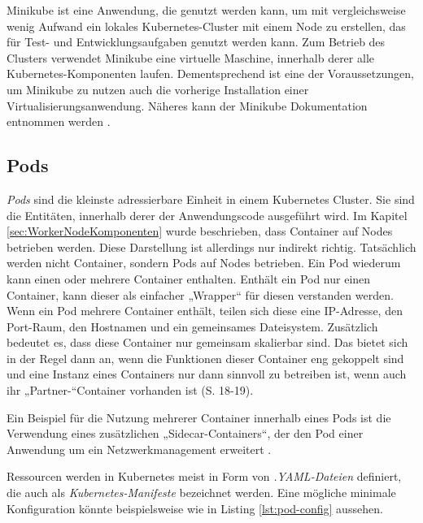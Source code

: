 \documentclass[11pt,a4paper]{article}
\begin{document}
Minikube ist eine Anwendung, die genutzt werden kann, um mit vergleichsweise wenig Aufwand ein lokales
Kubernetes-Cluster mit einem Node zu erstellen, das für Test- und Entwicklungsaufgaben genutzt werden kann.
Zum Betrieb des Clusters verwendet Minikube eine virtuelle Maschine, innerhalb derer
alle Kubernetes-Komponenten laufen. Dementsprechend ist eine der Voraussetzungen,
um Minikube zu nutzen auch die vorherige Installation einer Virtualisierungsanwendung.
Näheres kann der Minikube Dokumentation entnommen werden \cite{minikube}.

\subsection{Pods}
\emph{Pods} sind die kleinste adressierbare Einheit in einem Kubernetes Cluster.
Sie sind die Entitäten, innerhalb derer der Anwendungscode ausgeführt wird.
Im Kapitel \ref{sec:WorkerNodeKomponenten} wurde beschrieben, dass Container auf Nodes betrieben werden.
Diese Darstellung ist allerdings nur indirekt richtig. Tatsächlich werden nicht Container,
sondern Pods auf Nodes betrieben.
Ein Pod wiederum kann einen oder mehrere Container enthalten. Enthält ein Pod nur einen Container,
kann dieser als einfacher „Wrapper“ für diesen verstanden werden.
Wenn ein Pod mehrere Container enthält, teilen sich diese eine IP-Adresse,
den Port-Raum, den Hostnamen und ein gemeinsames Dateisystem.
Zusätzlich bedeutet es, dass diese Container nur gemeinsam skalierbar sind.
Das bietet sich in der Regel dann an, wenn die Funktionen dieser Container eng gekoppelt sind und eine Instanz eines
Containers nur dann sinnvoll zu betreiben ist, wenn auch ihr „Partner-“Container vorhanden ist \cite{9783969109625} \cite{Schmeling_Dargatz_2022} (S. 18-19).

Ein Beispiel für die Nutzung mehrerer Container innerhalb eines Pods ist die Verwendung
eines zusätzlichen „Sidecar-Containers“, der den Pod einer Anwendung um ein Netzwerkmanagement erweitert \cite{9783969109625}.

Ressourcen werden in Kubernetes meist in Form von \emph{.YAML-Dateien} definiert,
die auch als \emph{Kubernetes-Manifeste} bezeichnet werden.
Eine mögliche minimale Konfiguration könnte beispielsweise wie in Listing \ref{lst:pod-config} aussehen.


\end{document}
